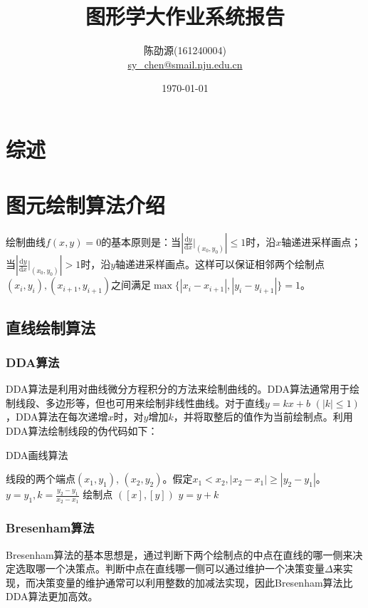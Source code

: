 \documentclass[a4paper,12pt]{article}
\title{图形学大作业系统报告}
\author{陈劭源(161240004) \\ \href{mailto:sy_chen@smail.nju.edu.cn}{sy\_chen@smail.nju.edu.cn}}
\date{\today}
\begin{document}
\maketitle

\section{综述}



\section{图元绘制算法介绍}
绘制曲线$f(x,y) = 0$的基本原则是：当$\left|\frac{\mathrm{d}y}{\mathrm{d}x} \big|_{(x_0, y_0)} \right| \leq 1$时，沿$x$轴递进采样画点；当$\left|\frac{\mathrm{d}y}{\mathrm{d}x} \big|_{(x_0, y_0)} \right| > 1$时，沿$y$轴递进采样画点。这样可以保证相邻两个绘制点$(x_i, y_i), (x_{i+1}, y_{i+1})$之间满足$\max\{|x_i - x_{i+1}|, |y_i - y_{i+1}|\} = 1$。

\subsection{直线绘制算法}

\subsubsection{DDA算法}

DDA算法是利用对曲线微分方程积分的方法来绘制曲线的。DDA算法通常用于绘制线段、多边形等，但也可用来绘制非线性曲线\cite{wiki:DDA}。对于直线$y = kx + b$ $(|k| \leq 1)$，DDA算法在每次递增$x$时，对$y$增加$k$，并将取整后的值作为当前绘制点。利用DDA算法绘制线段的伪代码如下：

\begin{algorithm}[htb] 
\caption{DDA画线算法} 
\label{alg:DDA} 
\begin{algorithmic}[1] 
\Require 
线段的两个端点$(x_1, y_1)$, $(x_2, y_2)$。假定$x_1 < x_2, |x_2 - x_1| \geq |y_2 - y_1|$。
\State $y = y_1, k = \frac{y_2 - y_1}{x_2 - x_1}$
    \State 绘制点 $([x], [y])$
    \State $y = y + k$
\EndFor
\end{algorithmic} 
\end{algorithm}

\subsubsection{Bresenham算法}

Bresenham算法的基本思想是，通过判断下两个绘制点的中点在直线的哪一侧来决定选取哪一个决策点。判断中点在直线哪一侧可以通过维护一个决策变量$\Delta$来实现，而决策变量的维护通常可以利用整数的加减法实现\cite{wiki:Bresenham}，因此Bresenham算法比DDA算法更加高效。
\end{document}
